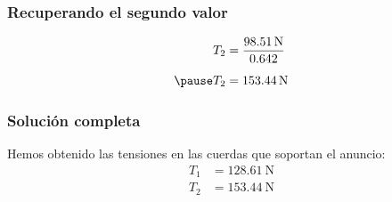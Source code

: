 \documentclass[12pt]{beamer}
\begin{document}
\begin{frame}
\frametitle{Recuperando el segundo valor}
\begin{eqnarray*}
\begin{aligned}
T_{2} &= \dfrac{\SI{98.51}{\newton}}{0.642} \\[0.5em] \pause
T_{2} &= \SI{153.44}{\newton}
\end{aligned}
\end{eqnarray*}
\end{frame}
\begin{frame}
\frametitle{Solución completa}
Hemos obtenido las tensiones en las cuerdas que soportan el anuncio:
\begin{align*}
T_{1} &= \SI{128.61}{\newton} \\[0.5em]
T_{2} &= \SI{153.44}{\newton}
\end{align*}
\end{frame}
\end{document}
